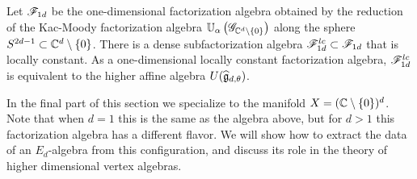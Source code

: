 \begin{thm}\label{thm sphere alg}
Let $\mathscr F_{1d}$ be the one-dimensional factorization algebra obtained by the reduction of the Kac-Moody factorization algebra $\mathbb U_\alpha\left(\mathscr G_{\mathbb C^{d} \setminus \{0\}} \right)$ along the sphere $S^{2d-1} \subset \mathbb C^{d} \setminus \{0\}$.
There is a dense subfactorization algebra $\mathscr F^{lc}_{1d} \subset \mathscr F_{1d}$ that is locally constant. 
As a one-dimensional locally constant factorization algebra, $\mathscr F^{lc}_{1d}$ is equivalent to the higher affine algebra $U(\widehat{\mathfrak g}_{d,\theta})$.
\end{thm}


In the final part of this section we specialize to the manifold $X = (\mathbb C \setminus \{0\})^d$. 
Note that when $d=1$ this is the same as the algebra above, but for $d>1$ this factorization algebra has a different flavor. 
We will show how to extract the data of an $E_d$-algebra from this configuration, and discuss its role in the theory of higher dimensional vertex algebras. 




